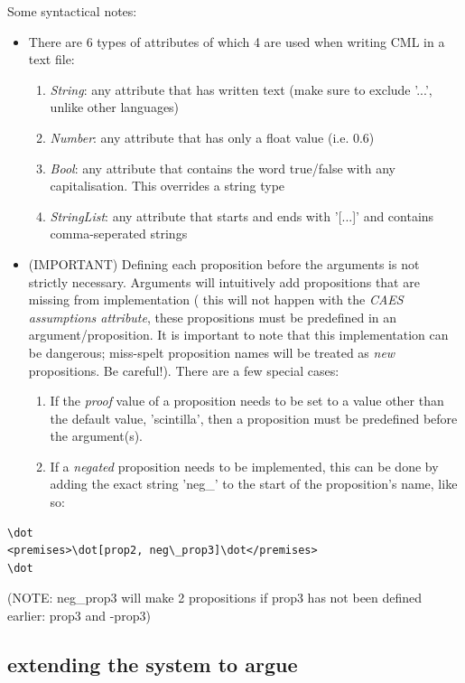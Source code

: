 \documentclass[10pt,a4paper,twocolumn]{article}
\begin{document}
Some syntactical notes:
\begin{itemize}
	\item {There are 6 types of attributes of which 4 are used when writing CML in a text file:
		\begin{enumerate}
		  \item \textit{String}: any attribute that has written text (make sure to exclude '...', unlike other languages)
		  \item \textit{Number}: any attribute that has only a float value (i.e. 0.6)
		  \item \textit{Bool}: any attribute that contains the word true/false with any capitalisation. This overrides a string type
		  \item \textit{StringList}: any attribute that starts and ends with '[...]' and contains comma-seperated strings
		\end{enumerate}}
	\item {(IMPORTANT) Defining each proposition before the arguments is not strictly necessary. 
	Arguments will intuitively add propositions that are missing from implementation (
	this will not happen with the \textit{CAES assumptions attribute}, these propositions 
	must be predefined in an argument/proposition. It is important to note that this implementation 
	can be dangerous; miss-spelt proposition names will be treated as \textit{new} propositions. 
	Be careful!). There are a few special cases:
	\begin{enumerate}
		\item If the \textit{proof} value of a proposition needs to be set to a value other than the default value, 'scintilla', then a proposition must be predefined before the argument(s).
		\item If a \textit{negated} proposition needs to be implemented, this can be done by adding the exact string 'neg\_' to the start of the proposition's name, like so:
	\end{enumerate}}
\end{itemize}
\begin{lstlisting}
\dot
<premises>\dot[prop2, neg\_prop3]\dot</premises>
\dot
\end{lstlisting}

(NOTE: neg\_prop3 will make 2 propositions if prop3 has not been defined earlier: prop3 and -prop3)

\subsection{extending the system to argue}
\end{document}

